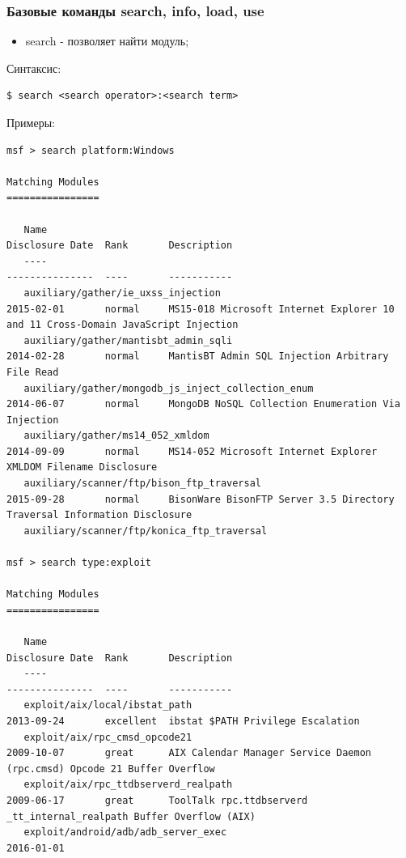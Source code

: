 \documentclass[10pt,a4paper,titlepage]{article}
\begin{document}
\subsubsection{Базовые команды search, info, load, use}
\begin{itemize}
\item search - позволяет найти модуль;
\end{itemize}
Синтаксис:
\begin{verbatim}
$ search <search operator>:<search term>
\end{verbatim}
Примеры:
\begin{verbatim}
msf > search platform:Windows

Matching Modules
================

   Name                                                                   Disclosure Date  Rank       Description
   ----                                                                   ---------------  ----       -----------
   auxiliary/gather/ie_uxss_injection                                     2015-02-01       normal     MS15-018 Microsoft Internet Explorer 10 and 11 Cross-Domain JavaScript Injection
   auxiliary/gather/mantisbt_admin_sqli                                   2014-02-28       normal     MantisBT Admin SQL Injection Arbitrary File Read
   auxiliary/gather/mongodb_js_inject_collection_enum                     2014-06-07       normal     MongoDB NoSQL Collection Enumeration Via Injection
   auxiliary/gather/ms14_052_xmldom                                       2014-09-09       normal     MS14-052 Microsoft Internet Explorer XMLDOM Filename Disclosure
   auxiliary/scanner/ftp/bison_ftp_traversal                              2015-09-28       normal     BisonWare BisonFTP Server 3.5 Directory Traversal Information Disclosure
   auxiliary/scanner/ftp/konica_ftp_traversal                     
   
msf > search type:exploit

Matching Modules
================

   Name                                                                   Disclosure Date  Rank       Description
   ----                                                                   ---------------  ----       -----------
   exploit/aix/local/ibstat_path                                          2013-09-24       excellent  ibstat $PATH Privilege Escalation
   exploit/aix/rpc_cmsd_opcode21                                          2009-10-07       great      AIX Calendar Manager Service Daemon (rpc.cmsd) Opcode 21 Buffer Overflow
   exploit/aix/rpc_ttdbserverd_realpath                                   2009-06-17       great      ToolTalk rpc.ttdbserverd _tt_internal_realpath Buffer Overflow (AIX)
   exploit/android/adb/adb_server_exec                                    2016-01-01      


\end{verbatim}
\end{document}
